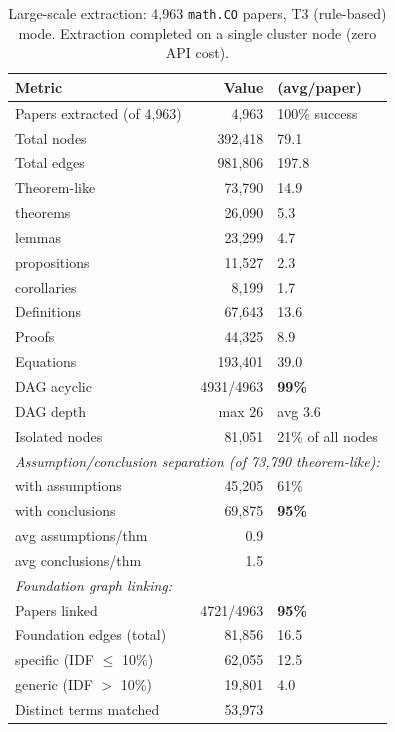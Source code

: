 \begin{table}[h]
\centering
\small
\caption{Large-scale extraction: 4{,}963 \texttt{math.CO} papers, T3 (rule-based) mode. Extraction completed on a single cluster node (zero API cost).}
\label{tab:scale}
\begin{tabular}{lr@{\hspace{1em}}l}
\toprule
\textbf{Metric} & \textbf{Value} & \textbf{(avg/paper)} \\
\midrule
Papers extracted (of 4{,}963) & 4{,}963 & 100\% success \\
Total nodes & 392{,}418 & 79.1 \\
Total edges & 981{,}806 & 197.8 \\
\midrule
Theorem-like & 73{,}790 & 14.9 \\
\quad theorems & 26{,}090 & 5.3 \\
\quad lemmas & 23{,}299 & 4.7 \\
\quad propositions & 11{,}527 & 2.3 \\
\quad corollaries & 8{,}199 & 1.7 \\
Definitions & 67{,}643 & 13.6 \\
Proofs & 44{,}325 & 8.9 \\
Equations & 193{,}401 & 39.0 \\
\midrule
DAG acyclic & 4931/4963 & \textbf{99\%} \\
DAG depth & max 26 & avg 3.6 \\
Isolated nodes & 81{,}051 & 21\% of all nodes \\
\midrule
\multicolumn{3}{l}{\textit{Assumption/conclusion separation (of 73{,}790 theorem-like):}} \\
\quad with assumptions & 45{,}205 & 61\% \\
\quad with conclusions & 69{,}875 & \textbf{95\%} \\
\quad avg assumptions/thm & 0.9 & \\
\quad avg conclusions/thm & 1.5 & \\
\midrule
\multicolumn{3}{l}{\textit{Foundation graph linking:}} \\
\quad Papers linked & 4721/4963 & \textbf{95\%} \\
\quad Foundation edges (total) & 81{,}856 & 16.5 \\
\quad \quad specific (IDF $\leq$ 10\%) & 62{,}055 & 12.5 \\
\quad \quad generic (IDF $>$ 10\%) & 19{,}801 & 4.0 \\
\quad Distinct terms matched & 53{,}973 & \\
\bottomrule
\end{tabular}
\end{table}
